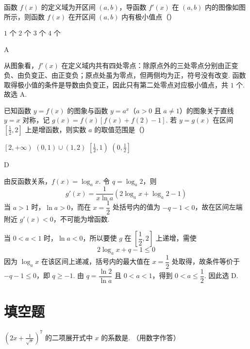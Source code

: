 \begin{problem}
函数 \(f(x)\) 的定义域为开区间 \((a,b)\)，导函数 \(f'(x)\) 在 \((a,b)\) 内的图像如图所示，则函数 \(f(x)\) 在开区间 \((a,b)\) 内有极小值点（\quad）


\choices
    {\(1\) 个}
    {\(2\) 个}
    {\(3\) 个}
    {\(4\) 个}
\end{problem}

\begin{answer}
A
\end{answer}

\begin{solution}
从图象看，\(f'(x)\) 在定义域内共有四处零点：除原点外的三处零点分别由正变负、由负变正、由正变负；原点处虽为零点，但两侧均为正，符号没有改变. 函数取得极小值的条件是导数由负变正，因此只有第二处零点对应极小值点，共 \(1\) 个. 故选 A.
\end{solution}

\begin{problem}
已知函数 \(y=f(x)\) 的图象与函数 \(y=a^{x}\)（\(a>0\) 且 \(a\neq 1\)）的图象关于直线 \(y=x\) 对称，记 \(g(x)=f(x)[f(x)+f(2)-1]\). 若 \(y=g(x)\) 在区间 \(\left[\frac{1}{2},2\right]\) 上是增函数，则实数 \(a\) 的取值范围是（\quad）

\choices
    {\(\left[2,+\infty\right)\)}
    {\((0,1)\cup(1,2)\)}
    {\(\left[\frac{1}{2},1\right)\)}
    {\(\left(0,\frac{1}{2}\right]\)}
\end{problem}

\begin{answer}
D
\end{answer}

\begin{solution}
由反函数关系，\(f(x)=\log_{a}x\). 令 \(q=\log_{a}2\)，则
\[
g'(x)=\frac{1}{x\ln a}\left(2\log_{a}x+\log_{a}2-1\right)
\]
当 \(a>1\) 时，\(\ln a>0\)，而在 \(x=\dfrac12\) 处括号内的值为 \(-q-1<0\)，故在区间左端附近 \(g'(x)<0\)，不可能为增函数.

当 \(0<a<1\) 时，\(\ln a<0\)，所以要使 \(g\) 在 \(\left[\dfrac12,2\right]\) 上递增，需使
\[
2\log_{a}x+q-1\leqslant0
\]
因为 \(\log_{a}x\) 在该区间上递减，括号内的最大值在 \(x=\dfrac12\) 处取得，故条件等价于 \(-q-1\leqslant0\)，即 \(q\geqslant-1\). 由 \(q=\dfrac{\ln2}{\ln a}\) 且 \(0<a<1\)，得到 \(0<a\leqslant\dfrac12\). 因此选 D.
\end{solution}

\section{填空题}
\begin{problem}
\(\left(2x+\frac{1}{\sqrt{x}}\right)^{7}\) 的二项展开式中 \(x\) 的系数是\fillinblank{}. （用数字作答）
\end{problem}


